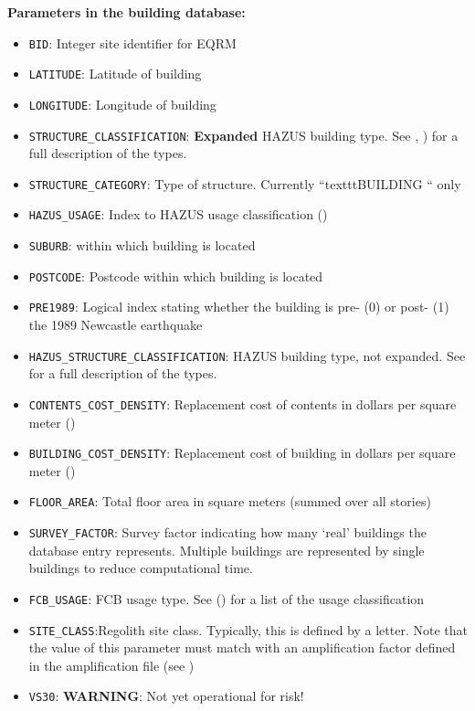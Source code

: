 \textbf{Parameters in the building database:}
\begin{itemize}
\item \texttt{BID}: Integer site identifier for EQRM
\item \texttt{LATITUDE}: Latitude of building
\item \texttt{LONGITUDE}: Longitude of building

\item \texttt{STRUCTURE\_CLASSIFICATION}: \textbf{Expanded} HAZUS
  building type. See 
    , ) for a full
    description of the types.

\item \texttt{STRUCTURE\_CATEGORY}: Type of structure. Currently ``texttt{BUILDING} `` only
\item \texttt{HAZUS\_USAGE}: Index to HAZUS usage classification ()
\item \texttt{SUBURB}: within which building is located
\item \texttt{POSTCODE}: Postcode within which building is located
\item \texttt{PRE1989}: Logical index stating whether the building is pre- (0) or post- (1) the 1989 Newcastle earthquake
\item \texttt{HAZUS\_STRUCTURE\_CLASSIFICATION}: HAZUS building
  type, not expanded. See  for a full
  description of the types.
\item \texttt{CONTENTS\_COST\_DENSITY}: Replacement cost of contents in dollars per square meter ()
\item \texttt{BUILDING\_COST\_DENSITY}: Replacement cost of building in dollars per square meter ()
\item \texttt{FLOOR\_AREA}: Total floor area in square meters (summed over all stories)
\item \texttt{SURVEY\_FACTOR}: Survey factor indicating how many
  `real' buildings the database entry represents.  Multiple buildings
  are represented by single buildings to reduce computational time.
\item \texttt{FCB\_USAGE}: FCB usage type. See
  ()  for a list of the usage
  classification
\item \texttt{SITE\_CLASS}:Regolith site class. Typically, this is defined
by a letter. Note that the value of this parameter must match with
an amplification factor defined in the amplification file (see
)
\item \texttt{VS30}: \textbf{WARNING}: Not yet operational for risk!
\end{itemize}


